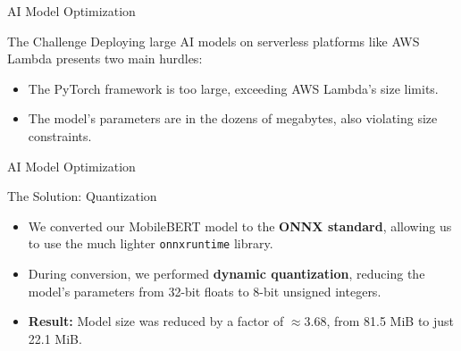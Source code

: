 \documentclass{beamer}
\begin{document}
\begin{frame}{AI Model Optimization}
    \begin{alertblock}{The Challenge}
        Deploying large AI models on serverless platforms like AWS Lambda presents two main hurdles:
        \begin{itemize}
            \item The PyTorch framework is too large, exceeding AWS Lambda's size limits.
            \item The model's parameters are in the dozens of megabytes, also violating size constraints.
        \end{itemize}
    \end{alertblock}
\end{frame}

\begin{frame}{AI Model Optimization}
    \begin{exampleblock}{The Solution: Quantization}
        \begin{itemize}
            \item We converted our MobileBERT model to the \textbf{ONNX standard}, allowing us to use the much lighter \texttt{onnxruntime} library.
            \item During conversion, we performed \textbf{dynamic quantization}, reducing the model's parameters from 32-bit floats to 8-bit unsigned integers.
            \item \textbf{Result:} Model size was reduced by a factor of $\approx3.68$, from 81.5 MiB to just 22.1 MiB.
        \end{itemize}
    \end{exampleblock}
\end{frame}
\end{document}
